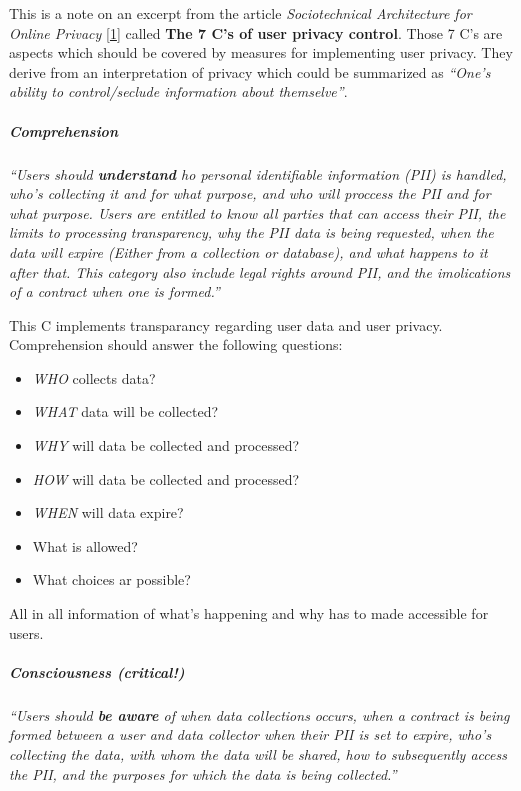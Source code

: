 This is a note on an excerpt from the article \emph{Sociotechnical
Architecture for Online Privacy} {[}\hyperref[references]{1}{]} called
\textbf{The 7 C's of user privacy control}. Those 7 C's are aspects
which should be covered by measures for implementing user privacy. They
derive from an interpretation of privacy which could be summarized as
\emph{``One's ability to control/seclude information about themselve''}.



\subparagraph{Comprehension}

\emph{``Users should \textbf{understand} ho personal identifiable
information (PII) is handled, who's collecting it and for what purpose,
and who will proccess the PII and for what purpose. Users are entitled
to know all parties that can access their PII, the limits to processing
transparency, why the PII data is being requested, when the data will
expire (Either from a collection or database), and what happens to it
after that. This category also include legal rights around PII, and the
imolications of a contract when one is formed.''}

This C implements transparancy regarding user data and user privacy.
Comprehension should answer the following questions:

\begin{itemize}
\itemsep1pt\parskip0pt
\item
  \emph{WHO} collects data?
\item
  \emph{WHAT} data will be collected?
\item
  \emph{WHY} will data be collected and processed?
\item
  \emph{HOW} will data be collected and processed?
\item
  \emph{WHEN} will data expire?
\item
  What is allowed?
\item
  What choices ar possible?
\end{itemize}

All in all information of what's happening and why has to made
accessible for users.

\subparagraph{Consciousness \textbf{(critical!)}}

\emph{``Users should \textbf{be aware} of when data collections occurs,
when a contract is being formed between a user and data collector when
their PII is set to expire, who's collecting the data, with whom the
data will be shared, how to subsequently access the PII, and the
purposes for which the data is being collected.''}

